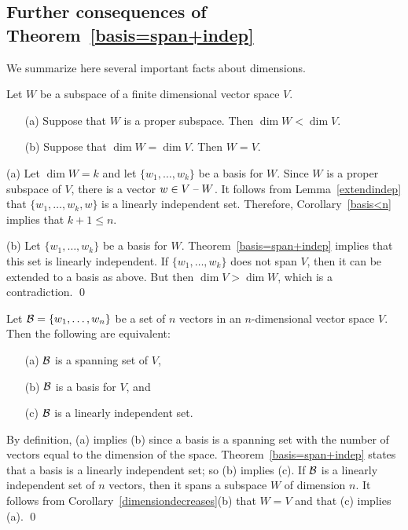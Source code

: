 \subsection*{Further consequences of Theorem~\ref{basis=span+indep}}

We summarize here several important facts about dimensions.

\begin{cor}  \label{dimensiondecreases}
Let $W$ be a subspace of a finite dimensional vector space $V$.
\begin{itemize}
\item[(a)]   Suppose that $W$ is a proper subspace.
Then $\dim W < \dim V$.
\item[(b)]   Suppose that $\dim W = \dim V$.  Then $W=V$.
\end{itemize}
\end{cor}

\proof
(a) Let $\dim W = k$ and let $\{w_1,\ldots,w_k\}$ be a basis for
$W$.  Since $W$ is a proper subspace of $V$, there is a vector
$w\in V\;\mbox{--}\; W$.  It follows from Lemma~\ref{extendindep} that
$\{w_1,\ldots,w_k,w\}$ is a linearly independent set.  Therefore,
Corollary~\ref{basis<n} implies that $k+1\le n$.

(b) Let $\{w_1,\ldots,w_k\}$ be a basis for $W$.
Theorem~\ref{basis=span+indep} implies that this set is linearly
independent.  If $\{w_1,\ldots,w_k\}$ does not span $V$, then it
can be extended to a basis as above.  But then $\dim V > \dim W$,
which is a contradiction.  \qed

\begin{cor} \label{C:dim=n}
Let ${\cal B}=\{w_1,\ldots,w_n\}$ be a set of $n$ vectors in an
$n$-dimensional vector space $V$.  Then the following are equivalent:
\begin{itemize}
\item[(a)]  ${\cal B}$ is a spanning set of $V$, 
\item[(b)]  ${\cal B}$ is a basis for $V$, and 
\item[(c)] ${\cal B}$ is a linearly independent set.
\end{itemize}
\end{cor}

\proof    By definition, (a) implies (b) since a basis is a spanning
set with the number of vectors equal to the dimension of the space.
Theorem~\ref{basis=span+indep} states that a basis is a linearly
independent set; so (b) implies (c). If ${\cal B}$ is a linearly
independent set of $n$ vectors, then it spans a subspace $W$ of
dimension $n$.  It follows from Corollary~\ref{dimensiondecreases}(b)
that $W=V$ and that (c) implies (a).  \qed


